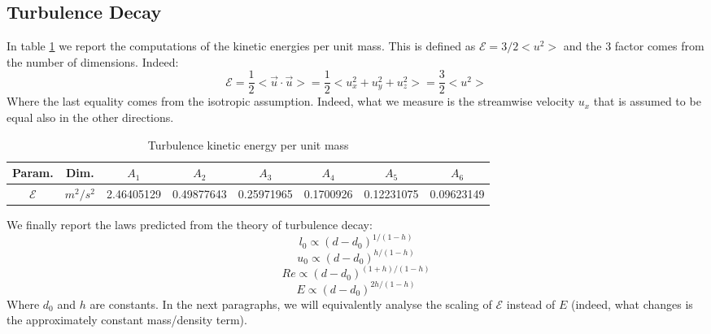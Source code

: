 \documentclass[11pt,titlepage]{article}
\begin{document}
\subsection{Turbulence Decay} \label{turbulence_decay}
In table \ref{tab5} we report the computations of the kinetic energies per unit mass. This is defined as $\mathcal{E} = 3/2<u^2>$ and the $3$ factor comes from the number of dimensions. Indeed: 
\begin{equation*}
	\mathcal{E} = \frac{1}{2} < \vec{u} \cdot \vec{u} >= \frac{1}{2} < u_x^2 + u_y^2 + u_z^2 > = \frac{3}{2} <u^2>
\end{equation*}
Where the last equality comes from the isotropic assumption. Indeed, what we measure is the streamwise velocity $u_x$ that is assumed to be equal also in the other directions.
\begin{table}[h!]
\centering
\caption{Turbulence kinetic energy per unit mass} \label{tab5}
    \begin{tabular}{ | c | c | c | c | c | c | c | c |}
        \hline
        Param. & Dim. & $A_1$ & $A_2$ & $A_3$ & $A_4$ & $A_5$ & $A_6$ \\
        \hline
        $\mathcal{E}$&$m^2/s^2$ &2.46405129& 0.49877643& 0.25971965& 0.1700926 & 0.12231075 &0.09623149  \\
        \hline
    \end{tabular}
\end{table}

We finally report the laws predicted from the theory of turbulence decay:
\begin{equation} \label{l_0_decay}
	l_0 \propto (d-d_0)^{1/(1-h)}
\end{equation}
\begin{equation}\label{u_0_decay}
	u_0 \propto (d-d_0)^{h/(1-h)}
\end{equation}
\begin{equation}\label{Re_decay}
	Re \propto (d-d_0)^{(1+h)/(1-h)}
\end{equation}
\begin{equation}\label{E_decay}
	E \propto (d-d_0)^{2h/(1-h)}
\end{equation}
Where $d_0$ and $h$ are constants. In the next paragraphs, we will equivalently analyse the scaling of $\mathcal{E}$ instead of $E$ (indeed, what changes is the approximately constant mass/density term).
\end{document}
